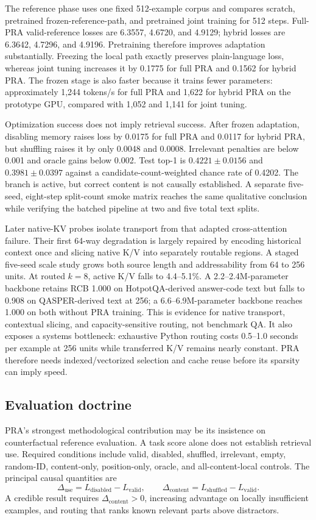 \documentclass[10pt,a4paper]{article}
\begin{document}
The reference phase uses one fixed 512-example corpus and compares scratch, pretrained frozen-reference-path, and pretrained joint training for 512 steps. Full-PRA valid-reference losses are 6.3557, 4.6720, and 4.9129; hybrid losses are 6.3642, 4.7296, and 4.9196. Pretraining therefore improves adaptation substantially. Freezing the local path exactly preserves plain-language loss, whereas joint tuning increases it by 0.1775 for full PRA and 0.1562 for hybrid PRA. The frozen stage is also faster because it trains fewer parameters: approximately 1,244 tokens/s for full PRA and 1,622 for hybrid PRA on the prototype GPU, compared with 1,052 and 1,141 for joint tuning.

Optimization success does not imply retrieval success. After frozen adaptation, disabling memory raises loss by 0.0175 for full PRA and 0.0117 for hybrid PRA, but shuffling raises it by only 0.0048 and 0.0008. Irrelevant penalties are below 0.001 and oracle gains below 0.002. Test top-1 is $0.4221\pm0.0156$ and $0.3981\pm0.0397$ against a candidate-count-weighted chance rate of 0.4202. The branch is active, but correct content is not causally established. A separate five-seed, eight-step split-count smoke matrix reaches the same qualitative conclusion while verifying the batched pipeline at two and five total text splits.

Later native-KV probes isolate transport from that adapted cross-attention failure. Their
first 64-way degradation is largely repaired by encoding historical context once and
slicing native K/V into separately routable regions. A staged five-seed scale study grows
both source length and addressability from 64 to 256 units. At routed $k=8$, active K/V
falls to 4.4--5.1\%. A 2.2--2.4M-parameter backbone retains RCB 1.000 on
HotpotQA-derived answer-code text but falls to 0.908 on QASPER-derived text at 256; a
6.6--6.9M-parameter backbone reaches 1.000 on both without PRA training. This is evidence
for native transport, contextual slicing, and capacity-sensitive routing, not benchmark
QA. It also exposes a systems bottleneck: exhaustive Python routing costs 0.5--1.0 seconds
per example at 256 units while transferred K/V remains nearly constant. PRA therefore
needs indexed/vectorized selection and cache reuse before its sparsity can imply speed.

\subsection{Evaluation doctrine}
PRA's strongest methodological contribution may be its insistence on counterfactual reference evaluation. A task score alone does not establish retrieval use. Required conditions include valid, disabled, shuffled, irrelevant, empty, random-ID, content-only, position-only, oracle, and all-content-local controls. The principal causal quantities are
\begin{equation}
\Delta_{\mathrm{use}}=L_{\mathrm{disabled}}-L_{\mathrm{valid}},\qquad
\Delta_{\mathrm{content}}=L_{\mathrm{shuffled}}-L_{\mathrm{valid}}.
\end{equation}
A credible result requires $\Delta_{\mathrm{content}}>0$, increasing advantage on locally insufficient examples, and routing that ranks known relevant parts above distractors.
\end{document}
